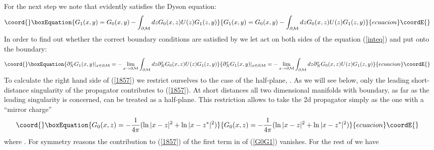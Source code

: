 \documentclass[a4paper,12pt]{article}
\begin{document}
For the next step we note that \coordHE{} evidently satisfies the Dyson
equation:
\begin{equation}\coord{}\boxEquation{
G_1(x,y)=G_0(x,y)-\int_{\partial {\cal M}} dz G_0(x,z)U(z)
G_1(z,y) \label{inteq}
}{
G_1(x,y)=G_0(x,y)-\int_{\partial {\cal M}} dz G_0(x,z)U(z)
G_1(z,y) }{ecuacion}\coordE{}\end{equation}
In order to find out whether the correct boundary conditions are
satisfied by \coordHE{} we let
\coordHE{} act on both sides of the equation (\ref{inteq})
and put \coordHE{} onto the boundary: 
\begin{equation}\coord{}\boxEquation{
\partial_N^x G_1(x,y) |_{x\in {\partial{\cal M}}}=
-\lim_{x\to {\partial{\cal M}}} 
\int_{\partial {\cal M}} dz\partial_N^x   G_0(x,z)U(z)
G_1(z,y) \label{1857}
}{
\partial_N^x G_1(x,y) |_{x\in {\partial{\cal M}}}=
-\lim_{x\to {\partial{\cal M}}} 
\int_{\partial {\cal M}} dz\partial_N^x   G_0(x,z)U(z)
G_1(z,y) }{ecuacion}\coordE{}\end{equation}
To calculate the right hand side of (\ref{1857}) we 
restrict ourselves to the case of the half-plane,
 \coordHE{}. As we will see below,
only the leading short-distance singularity of the propagator \coordHE{}
contributes to (\ref{1857}). At short distances all two
dimensional manifolds with boundary, as far as the leading singularity is
concerned, can be treated  as a
half-plane. This restriction allows to take the 2d propagator \coordHE{} 
simply as the one with a ``mirror charge''
\begin{equation}\coord{}\boxEquation{
G_0(x,z)=-\frac 1{4\pi} (\ln |x-z|^2 + \ln |x-z^*|^2 ) \label{1911}
}{
G_0(x,z)=-\frac 1{4\pi} (\ln |x-z|^2 + \ln |x-z^*|^2 ) }{ecuacion}\coordE{}\end{equation}
where \coordHE{}. For symmetry reasons the contribution 
to (\ref{1857}) of the 
first term in \coordHE{} of  (\ref{G0G1}) vanishes. For the rest
of  \coordHE{} we have
\end{document}
